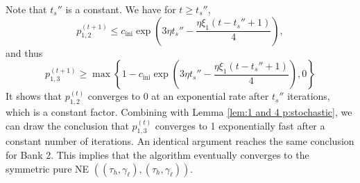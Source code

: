 Note that $t_s''$ is a constant. We have for $t\geq t_s''$,
$$p^{(t+1)}_{1,2}\leq c_{\text{ini}}\exp\left(3\eta t_s''-\frac{\eta\xi_1(t-t_s''+1)}{4}\right), $$ 
and thus 
$$ p^{(t+1)}_{1,3}\geq \max\left\{ 1 -c_{\text{ini}}\exp\left(3\eta t_s''-\frac{\eta\xi_1(t-t_s''+1)}{4}\right),0\right\} $$
It shows that $p_{1,2}^{(t)}$ converges to 0 at an exponential rate after $t_s''$ iterations, which is a constant factor. Combining with Lemma \ref{lem:1 and 4 p:stochastic}, we can draw the conclusion that $p_{1,3}^{(t)}$ converges to 1 exponentially fast after a constant number of iterations.
An identical argument reaches the same conclusion for Bank 2.
This implies that the algorithm eventually converges to the symmetric pure NE $((\tau_h, \gamma_{\ell}),(\tau_h, \gamma_{\ell}))$.
\\


